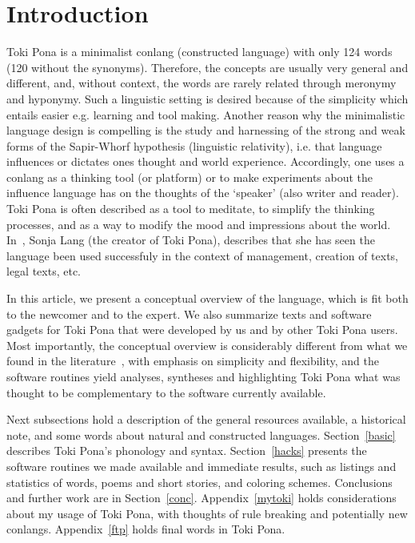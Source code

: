 \documentclass{article}
\begin{document}
\section{Introduction}\label{intro}
Toki Pona is a minimalist conlang (constructed language)
with only 124 words (120 without the synonyms).
Therefore, the concepts are usually very general and different,
and, without context, the words are rarely related through
meronymy and hyponymy.
Such a linguistic setting is desired because of the simplicity
which entails easier e.g. learning and tool making.
Another reason why the minimalistic language design is compelling
is the study and harnessing of the strong and weak forms of
the Sapir-Whorf hypothesis (linguistic relativity),
i.e. that language influences or dictates ones thought
and world experience.
Accordingly, one uses a conlang as a thinking tool (or platform)
or to make experiments about the influence language has on
the thoughts of the `speaker' (also writer and reader).
Toki Pona is often described as a tool to meditate,
to simplify the thinking processes, and as a way to modify
the mood and impressions about the world.~\cite{tp1,tp2,tp3,tp4}
In~\cite{interview}, Sonja Lang (the creator of Toki Pona),
describes that she has seen the language been used successfuly
in the context of management, creation of texts, legal texts,
etc.

In this article, we present a conceptual overview of the language,
which is fit both to the newcomer and to the expert.
We also summarize
texts and software gadgets
for Toki Pona that
were developed by us and by other Toki Pona users.
Most importantly, the conceptual overview is considerably different
from what we found in the literature~\cite{pu,pije,memrise},
with emphasis on simplicity and flexibility,
and the software routines yield analyses, syntheses
and highlighting Toki Pona what was thought to be complementary
to the software currently available.

Next subsections hold a description of the general resources available,
a historical note, and some words about natural and constructed languages.
Section~\ref{basic} describes Toki Pona's phonology and syntax.
Section~\ref{hacks} presents the software routines we made available
and immediate results, such as listings and statistics of words,
poems and short stories, and coloring schemes.
Conclusions and further work are in Section~\ref{conc}.
Appendix~\ref{mytoki} holds considerations about my usage of Toki Pona,
with thoughts of rule breaking and potentially new conlangs.
Appendix~\ref{ftp} holds final words in Toki Pona.
\end{document}
